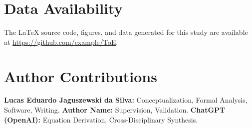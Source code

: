 \documentclass[12pt, a4paper]{article}
\begin{document}

\section*{Data Availability}
The LaTeX source code, figures, and data generated for this study are available at \url{https://github.com/example/ToE}.

\section*{Author Contributions}
\textbf{Lucas Eduardo Jaguszewski da Silva:} Conceptualization, Formal Analysis, Software, Writing.  
\textbf{Author Name:} Supervision, Validation.  
\textbf{ChatGPT (OpenAI):} Equation Derivation, Cross-Disciplinary Synthesis.  



\end{document}
